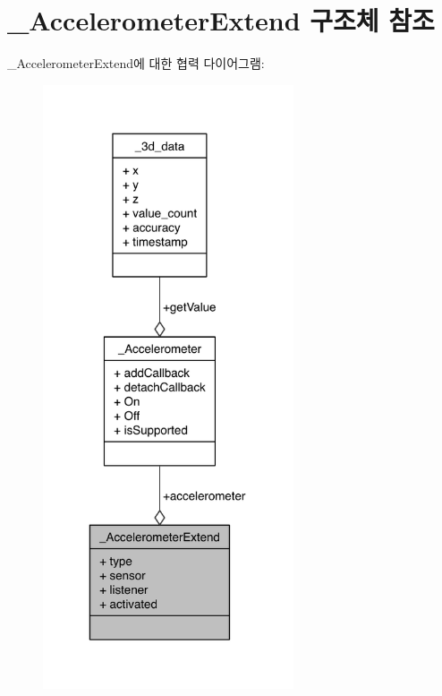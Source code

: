 \hypertarget{struct__AccelerometerExtend}{\section{\-\_\-\-Accelerometer\-Extend 구조체 참조}
\label{struct__AccelerometerExtend}
}


\-\_\-\-Accelerometer\-Extend에 대한 협력 다이어그램\-:
\nopagebreak
\begin{figure}[H]
\begin{center}
\leavevmode
\includegraphics[width=210pt]{d1/dde/struct__AccelerometerExtend__coll__graph}
\end{center}
\end{figure}

